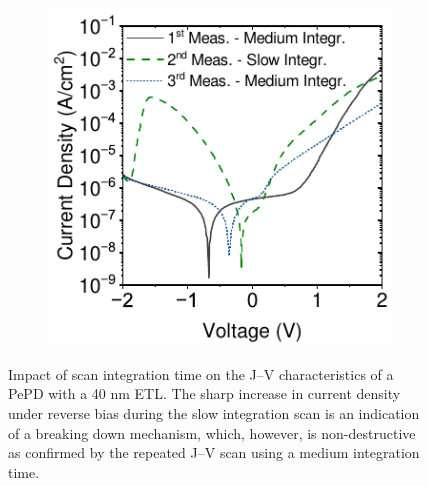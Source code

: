 \begin{figure}[htbp]
    \centering
    \begin{subfigure}[t]{0.5\textwidth}
        \centering
        \includegraphics[width=\textwidth]{chapters/transport_layers/images/JV_TiO12_Scan_Speed.pdf} %
                
    \end{subfigure}

    \caption[Impact of scan integration time on the J–V characteristics of a PePD with a 40 nm  ETL.]{Impact of scan integration time on the J–V characteristics of a PePD with a 40 nm  ETL. The sharp increase in current density under reverse bias during the slow integration scan is an indication of a breaking down mechanism, which, however, is non-destructive as confirmed by the repeated J–V scan using a medium integration time.}
    \label{fig:tio2:scan_speed}
\end{figure}

